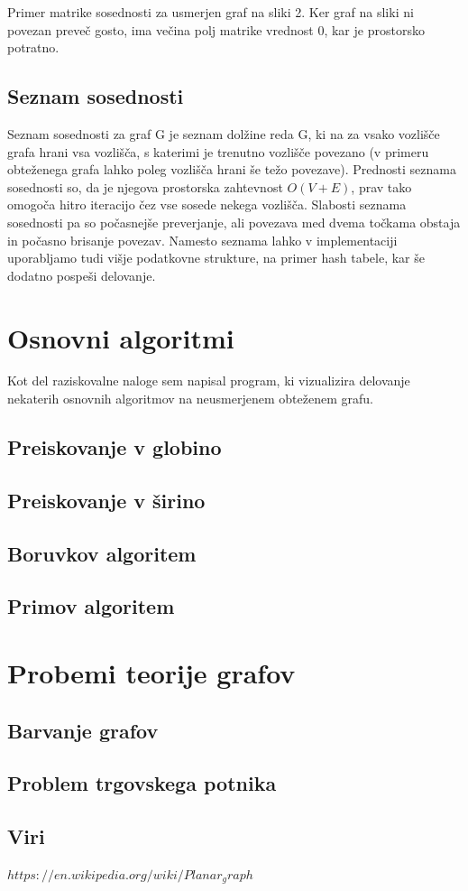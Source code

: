 \documentclass[11pt]{article}
\begin{document}
\thickspace

\noindent
Primer matrike sosednosti za usmerjen graf na sliki 2. Ker graf na sliki ni povezan preveč gosto, ima večina polj matrike vrednost 0, kar je prostorsko potratno.


\subsection{Seznam sosednosti}

Seznam sosednosti za graf G je seznam dolžine reda G, ki na za vsako vozlišče grafa hrani vsa vozlišča, s katerimi je trenutno vozlišče povezano (v primeru obteženega grafa lahko poleg vozlišča hrani še težo povezave). Prednosti seznama sosednosti so, da je njegova prostorska zahtevnost $O(V+E)$, prav tako omogoča hitro iteracijo čez vse sosede nekega vozlišča. Slabosti seznama sosednosti pa so počasnejše preverjanje, ali povezava med dvema točkama obstaja in počasno brisanje povezav. Namesto seznama lahko v implementaciji uporabljamo tudi višje podatkovne strukture, na primer hash tabele, kar še dodatno pospeši delovanje.

\section{Osnovni algoritmi}

Kot del raziskovalne naloge sem napisal program, ki vizualizira delovanje nekaterih osnovnih algoritmov na neusmerjenem obteženem grafu.

\subsection{Preiskovanje v globino}
\subsection{Preiskovanje v širino}
\subsection{Boruvkov algoritem}
\subsection{Primov algoritem}

\section{Probemi teorije grafov}

\subsection{Barvanje grafov}
\subsection{Problem trgovskega potnika}

\subsection{Viri}


$https://en.wikipedia.org/wiki/Planar_graph$
\end{document}
